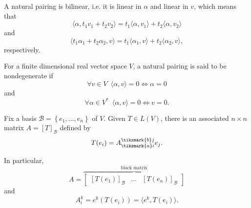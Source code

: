 \documentclass[notoc,notitlepage]{tufte-book}
\begin{document}
\begin{note}
  A natural pairing is bilinear,
  i.e. it is linear in $\alpha$ and linear in $v$,
  which means that
  \begin{equation*}
    \langle \alpha, t_1 v_1 + t_2 v_2 \rangle
    = t_1 \langle \alpha, v_1 \rangle + t_2 \langle \alpha, v_2 \rangle
  \end{equation*}
  and
  \begin{equation*}
    \langle t_1 \alpha_1 + t_2 \alpha_2, v \rangle
    = t_1 \langle \alpha_1, v \rangle + t_2 \langle \alpha_2, v \rangle,
  \end{equation*}
  respectively.
\end{note}

\begin{propo}\label{propo:natural_pairings_are_nondegenerate}
  For a finite dimensional real vector space $V$,
  a natural pairing is said to be nondegenerate if
  \begin{equation*}
    \forall v \in V \enspace \langle \alpha, v \rangle = 0 \iff \alpha = 0
  \end{equation*}
  and
  \begin{equation*}
    \forall \alpha \in V^* \enspace \langle \alpha, v \rangle = 0 \iff v = 0.
  \end{equation*}
\end{propo}

\begin{eg}
  Fix a basis $\mathcal{B} = \left\{ e_1, \ldots, e_n \right\}$ of $V$.
  Given $T \in L(V)$,
  there is an associated $n \times n$ matrix $A = [T]_{\mathcal{B}}$ defined by
  \begin{equation*}
    T(e_i) = A_{\tikzmark{a}i}^{\tikzmark{b}j} e_j.
  \end{equation*}
  In particular,
  \begin{equation*}
    A = \overbrace{
      \begin{bmatrix}
        [ T(e_1) ]_{\mathcal{B}} & \hdots & [ T(e_n) ]_{\mathcal{B}}
      \end{bmatrix}
    }^{\text{block matrix}}
  \end{equation*}
  and
  \begin{equation*}
    A_i^k = e^k( T(e_i) ) = \langle e^k, T(e_i) \rangle.
  \end{equation*}
\end{eg}
\end{document}
